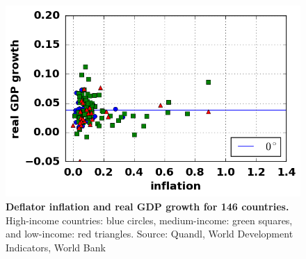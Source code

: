 \begin{figure}[h]
\caption{\label{fig_moneyGDPOpen} \textbf{Deflator inflation and real GDP growth for 146 countries.} High-income countries: blue circles, medium-income: green squares, and low-income: red triangles. {\tiny Source: Quandl, World Development Indicators, World Bank}}
\hspace*{-.5cm}\includegraphics[height = 7.cm]{./png/fig_inflationGDPOpen.png}
\end{figure}